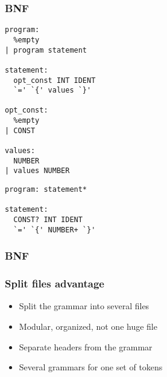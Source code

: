 \begin{frame}
  \frametitle{BNF}
  \usebox{\codebox}
\end{frame}
\begin{lrbox}{\codebox}
  \begin{tcolorbox}[title=\centering{BNF}\\Bison\hspace{0.45\linewidth} Menhir,sidebyside]%
  \begin{lstlisting}
program:
  %empty
| program statement

statement:
  opt_const INT IDENT
  `=' `{' values `}'

opt_const:
  %empty
| CONST

values:
  NUMBER
| values NUMBER
\end{lstlisting}
\tcblower
  \begin{lstlisting}
program: statement*

statement:
  CONST? INT IDENT
  `=' `{' NUMBER+ `}'
  \end{lstlisting}
  \end{tcolorbox}
\end{lrbox}

\begin{frame}
  \frametitle{BNF}
  \usebox{\codebox}
\end{frame}


\begin{frame}[fragile]
  \frametitle{Split files advantage}
  \begin{itemize}
    \item Split the grammar into several files
    \item Modular, organized, not one huge file
    \item Separate headers from the grammar
    \item Several grammars for one set of tokens
  \end{itemize}
\end{frame}
